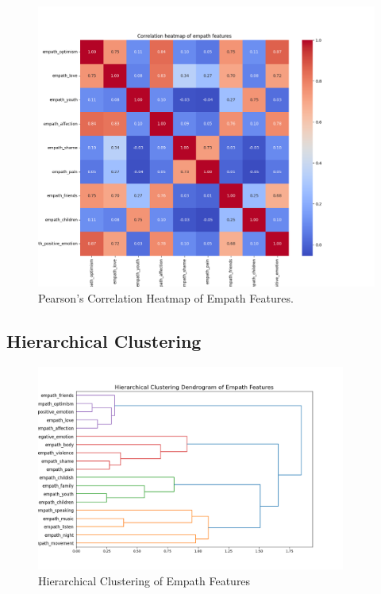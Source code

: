 \begin{center}
\begin{figure}[H]
  \centering
  \includegraphics[width=5in]{img/corr_heatmap_empath.png}
  \caption{Pearson's Correlation Heatmap of Empath Features.}
  \label{Figure:fig_beh}
\end{figure}
\end{center}

\subsection*{Hierarchical Clustering}
\label{sec:hierarchicalclustering}

\begin{center}
\begin{figure}[H]
  \centering
  \includegraphics[width=4in]{img/dendrogram_empath.png}
  \caption{Hierarchical Clustering of Empath Features}
  \label{Figure:dendrogram_spotify_features}
\end{figure}
\end{center}


